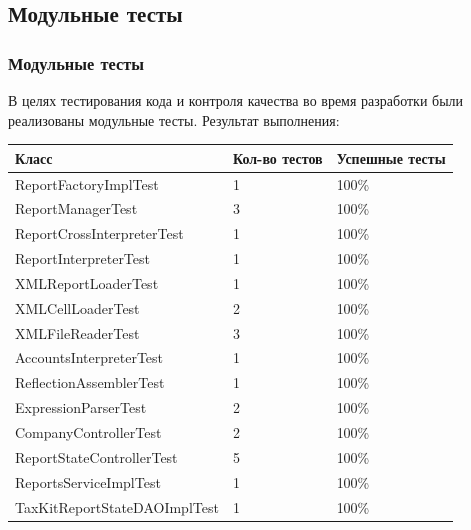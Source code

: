 \documentclass[xcolor=pdftex, dvipsnames, table]{beamer}
\begin{document}
\subsection{Модульные тесты}
\begin{frame}
  \frametitle{Модульные тесты}
  В целях тестирования кода и контроля качества во время разработки были реализованы модульные тесты.
  Результат выполнения:
  \begin{center}
    \small {
      \begin{tabular}{|m{6cm}|m{2cm}|m{2cm}|} \hline
        \textbf{Класс} &
        \textbf{Кол-во тестов} &
        \textbf{Успешные тесты} \\ \hline
        ReportFactoryImplTest & 1 & 100\% \\ \hline
        ReportManagerTest & 3 & 100\% \\ \hline
        ReportCrossInterpreterTest & 1 & 100\% \\ \hline
        ReportInterpreterTest & 1 & 100\% \\ \hline
        XMLReportLoaderTest & 1 & 100\% \\ \hline
        XMLCellLoaderTest & 2 & 100\% \\ \hline
        XMLFileReaderTest & 3 & 100\% \\ \hline
        AccountsInterpreterTest & 1 & 100\% \\ \hline
        ReflectionAssemblerTest & 1 & 100\% \\ \hline
        ExpressionParserTest & 2 & 100\% \\ \hline
        CompanyControllerTest & 2 & 100\% \\ \hline
        ReportStateControllerTest & 5 & 100\%  \\ \hline
        ReportsServiceImplTest & 1 & 100\%  \\ \hline
        TaxKitReportStateDAOImplTest & 1 & 100\%  \\ \hline
      \end{tabular}
    }
  \end{center}
\end{frame}
\end{document}
